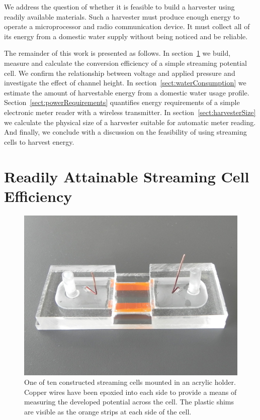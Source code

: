 \documentclass[10pt,final,journal]{IEEEtran}
\begin{document}
    We address the question of whether it is feasible to build a harvester using readily available materials.
    Such a harvester must produce enough energy to operate a microprocessor and radio communication device.
    It must collect all of its energy from a domestic water supply without being noticed and be reliable.

    The remainder of this work is presented as follows.
    In section~\ref{sect:streamingCell} we build, measure and calculate the conversion efficiency of a simple streaming potential cell.
    We confirm the relationship between voltage and applied pressure and investigate the effect of channel height.
    In section~\ref{sect:waterConsumption} we estimate the amount of harvestable energy from a domestic water usage profile.
    Section~\ref{sect:powerRequirements} quantifies energy requirements of a simple electronic meter reader with a wireless transmitter.
    In section~\ref{sect:harvesterSize} we calculate the physical size of a harvester suitable for automatic meter reading.
    And finally, we conclude with a discussion on the feasibility of using streaming cells to harvest energy.

    \section{Readily Attainable Streaming Cell Efficiency} \label{sect:streamingCell}
    \begin{figure}
        \begin{center}
        \includegraphics[width=\linewidth]{Photo_streamingPotential_Assembly_Step3.JPG}
        \end{center}
        \caption{One of ten constructed streaming cells mounted in an acrylic holder. Copper wires have been epoxied into each side to provide a means of measuring the developed potential across the cell. The plastic shims are visible as the orange strips at each side of the cell.}
        \label{fig:cell}
    \end{figure}
\end{document}
